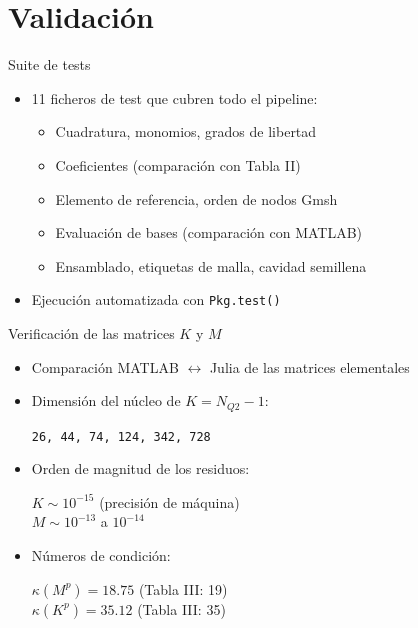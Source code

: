 \documentclass[aspectratio=169,11pt]{beamer}
\begin{document}
\section{Validación}

\begin{frame}{Suite de tests}
  \begin{itemize}
    \item 11 ficheros de test que cubren todo el pipeline:
      \begin{itemize}
        \item Cuadratura, monomios, grados de libertad
        \item Coeficientes (comparación con Tabla II)
        \item Elemento de referencia, orden de nodos Gmsh
        \item Evaluación de bases (comparación con MATLAB)
        \item Ensamblado, etiquetas de malla, cavidad semillena
      \end{itemize}
    \item Ejecución automatizada con \texttt{Pkg.test()}
  \end{itemize}
\end{frame}

\begin{frame}{Verificación de las matrices $K$ y $M$}
  \begin{itemize}
    \item Comparación MATLAB $\leftrightarrow$ Julia de las matrices elementales
    \item Dimensión del núcleo de $K = N_{Q2} - 1$:
      \begin{center}
        \texttt{26, 44, 74, 124, 342, 728}
      \end{center}
    \item Orden de magnitud de los residuos:
      \begin{center}
        $K \sim 10^{-15}$ \quad (precisión de máquina) \\
        $M \sim 10^{-13}$ a $10^{-14}$
      \end{center}
    \item Números de condición:
      \begin{center}
        $\kappa(M^p) = 18.75$ \quad (Tabla III: 19) \\
        $\kappa(K^p) = 35.12$ \quad (Tabla III: 35)
      \end{center}
  \end{itemize}
\end{frame}
\end{document}
